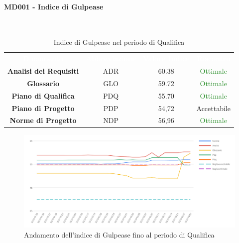 \paragraph{MD001 - Indice di Gulpease}\mbox{}\\[0,3cm]
\begin{table}[H]
	\centering
	\begin{tabular}{cccc}
	\rowcolor{greySWEight}
	\textcolor{white}{\textbf{Documento}} & 
	\textcolor{white}{\textbf{Abbreviazione}} &
	\textcolor{white}{\textbf{Valore Indice}}&
	\textcolor{white}{\textbf{Riscontro}}\\
	
	\textbf{Analisi dei Requisiti} & ADR & 60.38 & \textcolor{ForestGreen}{Ottimale} \\
	\textbf{Glossario} & GLO & 59.72 & \textcolor{ForestGreen}{Ottimale} \\
	\textbf{Piano di Qualifica} & PDQ & 55.70 & \textcolor{ForestGreen}{Ottimale} \\
	\textbf{Piano di Progetto} & PDP & 54,72 & \textcolor{YellowOrange}{Accettabile} \\
	\textbf{Norme di Progetto} & NDP & 56,96 & \textcolor{ForestGreen}{Ottimale} \\

	\end{tabular}
	\caption{Indice di Gulpease nel periodo di Qualifica}
\end{table}

\begin{figure}[H]
	\includegraphics[width=1\linewidth]{sez/App_Esito/Qualifica/graph/QU_Storico_Gulp.pdf}
	\caption{Andamento dell'indice di Gulpease fino al periodo di Qualifica}
\end{figure}